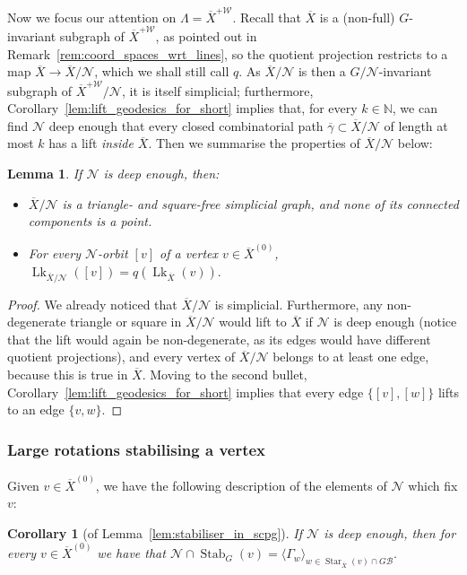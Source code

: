 \documentclass[svgnames]{amsart}
\theoremstyle{plain}
\newtheorem{lemma}[thm]{Lemma}
\newtheorem{cor}[thm]{Corollary}
\theoremstyle{definition}
\newcommand{\ov}[1]{\overline{#1}}
\newcommand{\link}{\operatorname{Lk}}
\newcommand{\Stab}[2]{\operatorname{Stab}_{#1}(#2)}
\newcommand{\N}{\mathcal{N}}
\newcommand{\B}{\mathcal{B}}
\newcommand{\W}{\mathcal{W}}
\begin{document}
Now we focus our attention on $\Lambda=\ov X^{+\W}$. Recall that $\ov X$ is a (non-full) $G$-invariant subgraph of $\ov X^{+\W}$, as pointed out in Remark~\ref{rem:coord_spaces_wrt_lines}, so the quotient projection restricts to a map $\ov X\to \ov X/\N$, which we shall still call $q$. As $\ov X/\N$ is then a $G/\N$-invariant subgraph of $\ov X^{+\W}/\N$, it is itself simplicial; furthermore, Corollary~\ref{lem:lift_geodesics_for_short} implies that, for every $k\in\mathbb{N}$, we can find $\N$ deep enough that every closed combinatorial path $\ov\gamma\subset \ov X/\N$ of length at most $k$ has a lift \emph{inside $\ov X$}. Then we summarise the properties of $\ov X/\N$ below:
\begin{lemma}\label{lem:ovX/N_is_good}
    If $\N$ is deep enough, then:
    \begin{itemize}
        \item $\ov X/\N$ is a triangle- and square-free simplicial graph, and none of its connected components is a point.
        \item For every $\N$-orbit $[v]$ of a vertex $v\in\ov X^{(0)}$, $\link_{\ov X/\N}([v])=q(\link_{\ov X}(v)).$
    \end{itemize} 
\end{lemma}

\begin{proof}
    We already noticed that $\ov X/\N$ is simplicial. Furthermore, any non-degenerate triangle or square in $\ov X/\N$ would lift to $\ov X$ if $\N$ is deep enough (notice that the lift would again be non-degenerate, as its edges would have different quotient projections), and every vertex of $\ov X/\N$ belongs to at least one edge, because this is true in $\ov X$.
    Moving to the second bullet, Corollary~\ref{lem:lift_geodesics_for_short} implies that every edge $\{[v], [w]\}$ lifts to an edge $\{v,w\}$. 
\end{proof}

\subsubsection{Large rotations stabilising a vertex}
Given $v\in\ov{X}^{(0)}$, we have the following description of the elements of $\N$ which fix $v$:

\begin{cor}[of Lemma~\ref{lem:stabiliser_in_scpg}]\label{cor:N_cap_Stabv}
     If $\N$ is deep enough, then for every $v\in \ov{X}^{(0)}$ we have that
     $\N\cap\Stab{G}{v}=\langle \Gamma_w\rangle_{w\in\operatorname{Star}_{\ov X}(v)\cap G\B}.$
 \end{cor}
\end{document}
